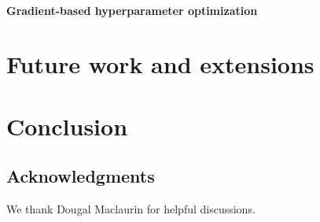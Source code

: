 \documentclass{article}
\begin{document}
\paragraph{Gradient-based hyperparameter optimization}




\section{Future work and extensions}



\section{Conclusion}

\subsection*{Acknowledgments}
We thank Dougal Maclaurin for helpful discussions.



\end{document}
